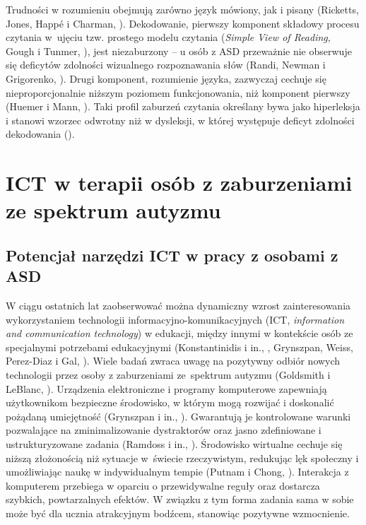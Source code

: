     Trudności w rozumieniu obejmują zarówno język mówiony, jak i pisany (Ricketts, Jones, Happ{\'e} i Charman, \cite*{ricketts2013reading}).
    Dekodowanie, pierwszy komponent składowy procesu czytania w~ujęciu tzw. prostego modelu czytania (\emph{Simple View of Reading}, Gough i Tunmer, \cite*{gough1986decoding}), jest niezaburzony -- u osób z ASD przeważnie nie obserwuje się deficytów zdolności wizualnego rozpoznawania słów (Randi, Newman i Grigorenko, \cite*{randi2010teaching}).
    Drugi komponent, rozumienie języka, zazwyczaj cechuje się nieproporcjonalnie niższym poziomem funkcjonowania, niż komponent pierwszy (Huemer i Mann, \cite*{huemer2010comprehensive}).
    Taki profil zaburzeń czytania określany bywa jako hiperleksja i stanowi wzorzec odwrotny niż w dysleksji, w której występuje deficyt zdolności dekodowania (\cite{aaron2012dyslexia}).

\section{ICT w terapii osób z zaburzeniami ze spektrum autyzmu}

    \subsection{Potencjał narzędzi ICT w pracy z osobami z ASD}
    \label{subsection:ict}
    W ciągu ostatnich lat zaobserwować można dynamiczny wzrost zainteresowania wykorzystaniem technologii informacyjno-komunikacyjnych (ICT, \emph{information and communication technology}) w edukacji, między innymi w kontekście osób ze specjalnymi potrzebami edukacyjnymi (Konstantinidis i in., \cite*{konstantinidis2009information}, Grynszpan, Weiss, Perez-Diaz i Gal, \cite*{grynszpan2014innovative}).
    Wiele badań zwraca uwagę na pozytywny odbiór nowych technologii przez osoby z zaburzeniami ze~spektrum autyzmu (Goldsmith i LeBlanc, \cite*{goldsmith2004use}).
    Urządzenia elektroniczne i programy komputerowe zapewniają użytkownikom bezpieczne środowisko, w którym mogą rozwijać i doskonalić pożądaną umiejętność (Grynszpan i in., \cite*{grynszpan2014innovative}).
    Gwarantują je kontrolowane warunki pozwalające na zminimalizowanie dystraktorów oraz jasno zdefiniowane i ustrukturyzowane zadania (Ramdoss i in., \cite*{ramdoss2011use}).
    Środowisko wirtualne cechuje się niższą złożonością niż sytuacje w~świecie rzeczywistym, redukując lęk społeczny i umożliwiając naukę w indywidualnym tempie (Putnam i Chong, \cite*{putnam2008software}).
    Interakcja z komputerem przebiega w oparciu o przewidywalne reguły oraz dostarcza szybkich, powtarzalnych efektów.
    W związku z tym forma zadania sama w sobie może być dla ucznia atrakcyjnym bodźcem, stanowiąc pozytywne wzmocnienie.
    
